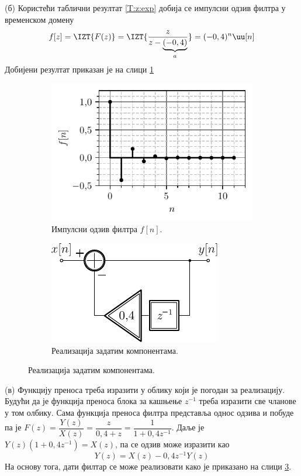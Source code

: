 (б) Користећи таблични резултат \ref{T:z:exp} добија се импулсни одзив филтра у временском домену
\begin{eqnarray}
    f[z] = \IZT{F(z)} = \IZT{\dfrac{z}{z-\underbrace{(-0,4)}_a} } = (-0,4)^n \uu[n]
\end{eqnarray}
Добијени резултат приказан је на слици \ref{fig:\ID.1}
%

\begin{figure}[b!]
    \centering
        \begin{subfigure}{0.59\textwidth}
            \centering
            \includegraphics{fig/h_equalizer.pdf}
            \caption{Импулсни одзив филтра $f[n]$.}
            \label{fig:\ID.1}
        \end{subfigure}
        \begin{subfigure}{0.39\textwidth}
            \centering
            \includegraphics{fig/equalizer_blok.pdf}
            \caption{Реализација задатим компонентама.}
            \label{fig:\ID.2}
        \end{subfigure}
    \end{figure}
%
(в) Функцију преноса треба изразити у облику који је погодан за реализацију. Будући да је функција преноса блока за кашњење
$z^{-1}$ треба изразити све чланове у том олбику.
Сама функција преноса филтра представља однос одзива и побуде па је $F(z) = \dfrac{Y(z)}{X(z)} = \dfrac{z}{0,4 + z} = 
\dfrac{1}{1 + 0,4 z^{-1}}$. Даље је $Y(z) (1 + 0,4 z^{-1}) = X(z)$, па се одзив може изразити као 
\begin{equation}
    Y(z) = X(z) - 0,4 z^{-1} Y(z)
\end{equation}
На основу тога, дати филтар се може реализовати како је приказано на слици \ref{fig:\ID.2}.

